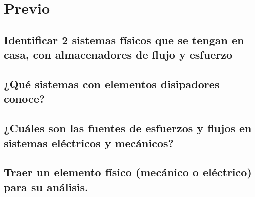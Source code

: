 \noindent \justifying
\section{Previo}


\subsection{Identificar 2 sistemas físicos que se tengan en casa, con almacenadores de flujo y esfuerzo}
\subsection{¿Qué sistemas con elementos disipadores conoce?}
\subsection{¿Cuáles son las fuentes de esfuerzos y flujos en sistemas eléctricos y mecánicos?}
\subsection{Traer un elemento físico (mecánico o eléctrico) para su análisis.}


